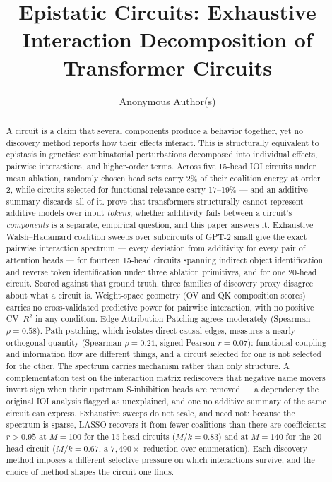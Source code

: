 \documentclass{article}
\title{Epistatic Circuits: Exhaustive Interaction Decomposition of Transformer Circuits}
\author{Anonymous Author(s)}
\begin{document}
\maketitle

\begin{abstract}
A circuit is a claim that several components produce a behavior together, yet no
discovery method reports how their effects interact. This is structurally equivalent
to epistasis in genetics: combinatorial perturbations decomposed into individual
effects, pairwise interactions, and higher-order terms. Across five 15-head IOI
circuits under mean ablation, randomly chosen head sets carry 2\% of their coalition
energy at order 2, while circuits selected for functional relevance carry 17--19\% ---
and an additive summary discards all of it. \citet{leemann2024slalom} prove that transformers structurally cannot
represent additive models over input \emph{tokens}; whether additivity fails between a
circuit's \emph{components} is a separate, empirical question, and this paper answers
it. Exhaustive
Walsh--Hadamard coalition sweeps over subcircuits of GPT-2 small give the exact
pairwise interaction spectrum --- every deviation from additivity for every pair of
attention heads --- for fourteen 15-head circuits spanning indirect object
identification and reverse token identification under three ablation primitives, and
for one 20-head circuit.
Scored against that ground truth, three families of discovery proxy disagree about what
a circuit is. Weight-space geometry (OV and QK composition scores) carries no
cross-validated predictive power for pairwise interaction, with no positive CV~$R^2$ in
any condition. Edge Attribution Patching agrees moderately (Spearman $\rho = 0.58$).
Path patching, which isolates direct causal edges, measures a nearly orthogonal
quantity (Spearman $\rho = 0.21$, signed Pearson $r = 0.07$): functional coupling and
information flow are different things, and a circuit selected for one is not selected
for the other.
The spectrum carries mechanism rather than only structure. A complementation test on
the interaction matrix rediscovers that negative name movers invert sign when their
upstream S-inhibition heads are removed --- a dependency the original IOI analysis
flagged as unexplained, and one no additive summary of the same circuit can express.
Exhaustive sweeps do not scale, and need not: because the spectrum is sparse, LASSO
recovers it from fewer coalitions than there are coefficients: $r > 0.95$ at
$M = 100$ for the 15-head circuits ($M/k = 0.83$) and at $M = 140$ for the 20-head
circuit ($M/k = 0.67$, a $7{,}490\times$ reduction over enumeration). Each discovery method imposes a different
selective pressure on which interactions survive, and the choice of method shapes the
circuit one finds.
\end{abstract}
\end{document}
